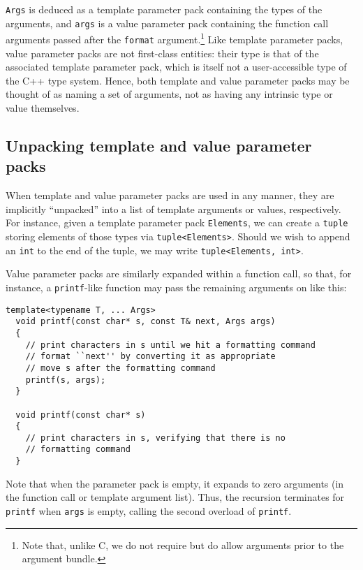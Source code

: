 \documentclass{article}
\begin{document}
\noindent
{\tt Args} is deduced as a template parameter pack containing the types of
the arguments, and {\tt args} is a value parameter pack containing
the function call arguments passed after the {\tt format}
argument.\footnote{Note that, unlike C, we do not require but
  do allow arguments prior to the argument bundle.} Like template
parameter packs, value parameter packs are not first-class entities:
their type is that of the associated template parameter pack, which is
itself not a user-accessible type of the C++ type system. 
Hence, both template and value
parameter packs may be thought of as naming a set of arguments, not as
having any intrinsic type or value themselves.

\subsection{Unpacking template and value parameter packs}
When template and value parameter packs are used in any manner, they
are implicitly ``unpacked'' into a list of template arguments or
values, respectively. For instance, given a template parameter pack
{\tt Elements}, we can create a {\tt tuple} storing elements of those
types via {\tt tuple<Elements>}. Should we wish to append an {\tt int}
to the end of the tuple, we may write {\tt tuple<Elements, int>}.

Value parameter packs are similarly expanded within a function call,
so that, for instance, a {\tt printf}-like function may pass the
remaining arguments on like this:
\begin{verbatim}
template<typename T, ... Args>
  void printf(const char* s, const T& next, Args args)
  {
    // print characters in s until we hit a formatting command
    // format ``next'' by converting it as appropriate
    // move s after the formatting command
    printf(s, args); 
  }

  void printf(const char* s)
  {
    // print characters in s, verifying that there is no 
    // formatting command
  }
\end{verbatim}

Note that when the parameter pack is empty, it expands to zero
arguments (in the function call or template argument list). Thus, the
recursion terminates for \texttt{printf} when {\tt args} is empty,
calling the second overload of \texttt{printf}.
\end{document}
